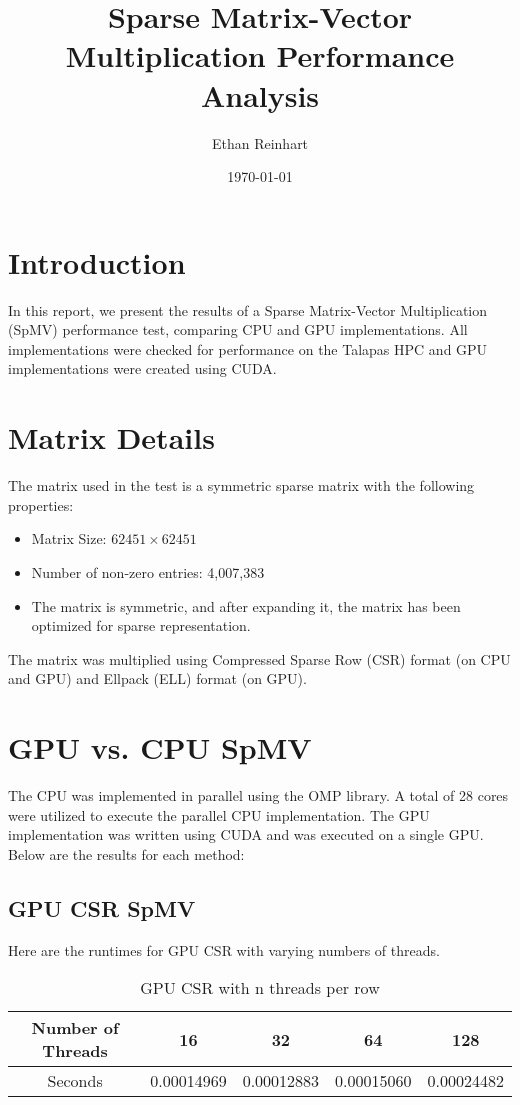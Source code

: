 \documentclass{article}
\title{Sparse Matrix-Vector Multiplication Performance Analysis}
\author{Ethan Reinhart}
\date{\today}
\begin{document}
\maketitle

\section*{Introduction}

In this report, we present the results of a Sparse Matrix-Vector Multiplication (SpMV) performance test, comparing CPU and GPU implementations. All implementations were checked for performance on the Talapas HPC and GPU implementations were created using CUDA.

\section*{Matrix Details}

The matrix used in the test is a symmetric sparse matrix with the following properties:
\begin{itemize}
    \item Matrix Size: $62451 \times 62451$ 
    \item Number of non-zero entries: 4,007,383
    \item The matrix is symmetric, and after expanding it, the matrix has been optimized for sparse representation.
\end{itemize}

The matrix was multiplied using Compressed Sparse Row (CSR) format (on CPU and GPU) and Ellpack (ELL) format (on GPU).

\section*{GPU vs. CPU SpMV}

The CPU was implemented in parallel using the OMP library. A total of 28 cores were utilized to execute the parallel CPU implementation. The GPU implementation was written using CUDA and was executed on a single GPU. Below are the results for each method:

\subsection*{GPU CSR SpMV}
Here are the runtimes for GPU CSR with varying numbers of threads.
\begin{table}[h!]
\centering
\begin{tabular}{|c|c|c|c|c|}
\hline
Number of Threads & 16 & 32 & 64 & 128 \\ \hline
Seconds & 0.00014969 & 0.00012883 & 0.00015060 & 0.00024482 \\ \hline
\end{tabular}
\caption{GPU CSR with n threads per row}
\label{tab:example}
\end{table}
\end{document}
